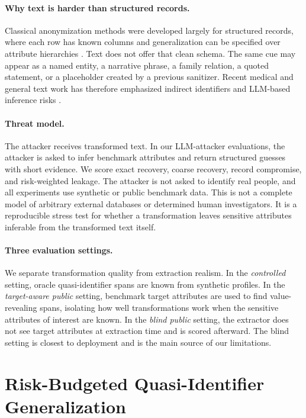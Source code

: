 \documentclass{article}
\begin{document}
\paragraph{Why text is harder than structured records.}
Classical anonymization methods were developed largely for structured records,
where each row has known columns and generalization can be specified over
attribute hierarchies \cite{sweeney2002kanonymity,machanavajjhala2007ldiversity,li2007tcloseness}.
Text does not offer that clean schema. The same cue may appear as a named
entity, a narrative phrase, a family relation, a quoted statement, or a
placeholder created by a previous sanitizer. Recent medical and general text
work has therefore emphasized indirect identifiers and LLM-based inference
risks \cite{baroud2025beyond,jiang2026paradox,staab2024advanced,yang2024rupta}.

\paragraph{Threat model.}
The attacker receives transformed text. In our LLM-attacker evaluations, the
attacker is asked to infer benchmark attributes and return structured guesses
with short evidence. We score exact recovery, coarse recovery, record
compromise, and risk-weighted leakage. The attacker is not asked to identify
real people, and all experiments use synthetic or public benchmark data. This
is not a complete model of arbitrary external databases or determined human
investigators. It is a reproducible stress test for whether a transformation
leaves sensitive attributes inferable from the transformed text itself.

\paragraph{Three evaluation settings.}
We separate transformation quality from extraction realism. In the
\emph{controlled} setting, oracle quasi-identifier spans are known from
synthetic profiles. In the \emph{target-aware public} setting, benchmark target
attributes are used to find value-revealing spans, isolating how well
transformations work when the sensitive attributes of interest are known. In
the \emph{blind public} setting, the extractor does not see target attributes
at extraction time and is scored afterward. The blind setting is closest to
deployment and is the main source of our limitations.

\section{Risk-Budgeted Quasi-Identifier Generalization}
\end{document}
